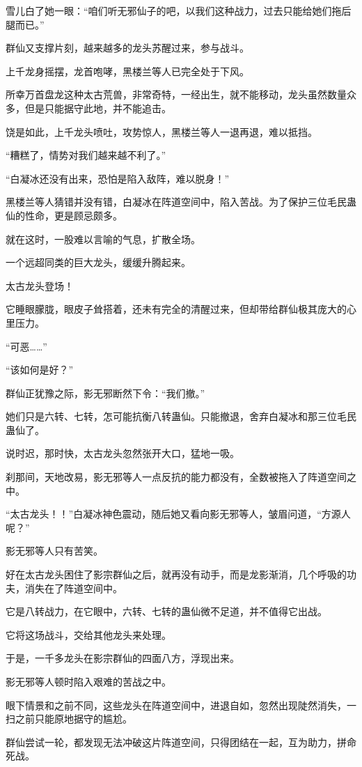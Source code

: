 \begin{this_body}
雪儿白了她一眼：“咱们听无邪仙子的吧，以我们这种战力，过去只能给她们拖后腿而已。”

群仙又支撑片刻，越来越多的龙头苏醒过来，参与战斗。

上千龙身摇摆，龙首咆哮，黑楼兰等人已完全处于下风。

所幸万首盘龙这种太古荒兽，非常奇特，一经出生，就不能移动，龙头虽然数量众多，但是只能据守此地，并不能追击。

饶是如此，上千龙头喷吐，攻势惊人，黑楼兰等人一退再退，难以抵挡。

“糟糕了，情势对我们越来越不利了。”

“白凝冰还没有出来，恐怕是陷入敌阵，难以脱身！”

黑楼兰等人猜错并没有错，白凝冰在阵道空间中，陷入苦战。为了保护三位毛民蛊仙的性命，更是顾忌颇多。

就在这时，一股难以言喻的气息，扩散全场。

一个远超同类的巨大龙头，缓缓升腾起来。

太古龙头登场！

它睡眼朦胧，眼皮子耸搭着，还未有完全的清醒过来，但却带给群仙极其庞大的心里压力。

“可恶……”

“该如何是好？”

群仙正犹豫之际，影无邪断然下令：“我们撤。”

她们只是六转、七转，怎可能抗衡八转蛊仙。只能撤退，舍弃白凝冰和那三位毛民蛊仙了。

说时迟，那时快，太古龙头忽然张开大口，猛地一吸。

刹那间，天地改易，影无邪等人一点反抗的能力都没有，全数被拖入了阵道空间之中。

“太古龙头！！”白凝冰神色震动，随后她又看向影无邪等人，皱眉问道，“方源人呢？”

影无邪等人只有苦笑。

好在太古龙头困住了影宗群仙之后，就再没有动手，而是龙影渐消，几个呼吸的功夫，消失在了阵道空间中。

它是八转战力，在它眼中，六转、七转的蛊仙微不足道，并不值得它出战。

它将这场战斗，交给其他龙头来处理。

于是，一千多龙头在影宗群仙的四面八方，浮现出来。

影无邪等人顿时陷入艰难的苦战之中。

眼下情景和之前不同，这些龙头在阵道空间中，进退自如，忽然出现陡然消失，一扫之前只能原地据守的尴尬。

群仙尝试一轮，都发现无法冲破这片阵道空间，只得团结在一起，互为助力，拼命死战。


\end{this_body}
